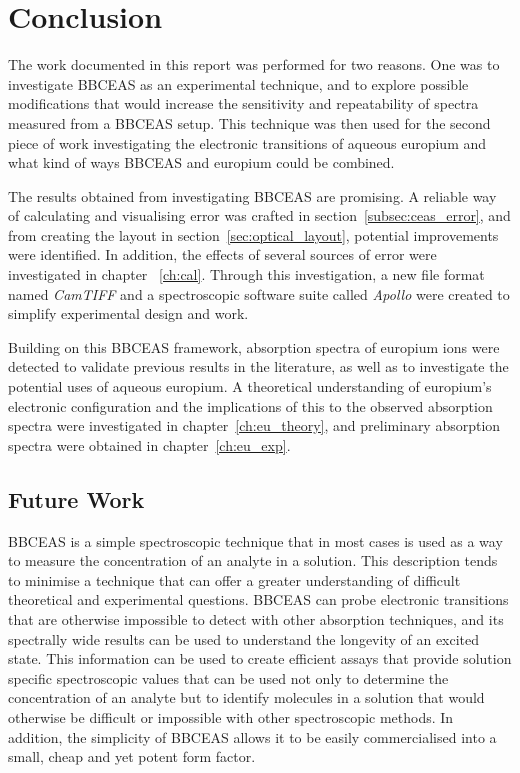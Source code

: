 \chapter{Conclusion} \label{ch:discussion}

The work documented in this report was performed for two reasons. One was to
investigate \ac{BBCEAS} as an experimental technique, and to explore possible
modifications that would increase the sensitivity and repeatability of spectra
measured from a \ac{BBCEAS} setup. This technique was then used for the second
piece of work investigating the electronic transitions of aqueous europium and
what kind of ways \ac{BBCEAS} and europium could be combined.

The results obtained from investigating \ac{BBCEAS} are promising.
A reliable way of calculating and visualising error was crafted in
section~\ref{subsec:ceas_error}, and from creating the layout in
section~\ref{sec:optical_layout}, potential improvements were identified. In
addition, the effects of several sources of error were investigated in chapter
~\ref{ch:cal}. Through this investigation, a new file format named
\emph{CamTIFF} and a spectroscopic software suite called \emph{Apollo} were
created to simplify experimental design and work.

Building on this \ac{BBCEAS} framework, absorption spectra of europium
ions were detected to validate previous results in the literature,
as well as to investigate the potential uses of aqueous europium. A
theoretical understanding of europium's electronic configuration and the
implications of this to the observed absorption spectra were investigated in
chapter~\ref{ch:eu_theory}, and preliminary absorption spectra were obtained
in chapter~\ref{ch:eu_exp}.



\section*{Future Work}

\acl{BBCEAS} is a simple spectroscopic technique that in most cases is
used as a way to measure the concentration of an analyte in a solution.
This description tends to minimise a technique that can offer a greater
understanding of difficult theoretical and experimental questions. \ac{BBCEAS}
can probe electronic transitions that are otherwise impossible to detect with
other absorption techniques, and its spectrally wide results can be used to
understand the longevity of an excited state. This information can be used to
create efficient assays that provide solution specific spectroscopic values
that can be used not only to determine the concentration of an analyte but
to identify molecules in a solution that would otherwise be difficult or
impossible with other spectroscopic methods. In addition, the simplicity of
\ac{BBCEAS} allows it to be easily commercialised into a small, cheap and yet
potent form factor.

